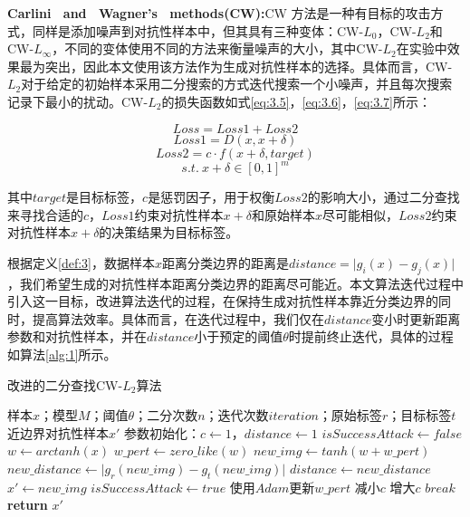 \noindent\textbf{Carlini \ and \ Wagner's \ methods(CW):}CW \cite{carlini2017towards}方法是一种有目标的攻击方式，同样是添加噪声到对抗性样本中，但其具有三种变体：CW-$L_0$，CW-$L_2$和CW-$L_{\infty}$，不同的变体使用不同的方法来衡量噪声的大小，其中CW-$L_2$在实验中效果最为突出，因此本文使用该方法作为生成对抗性样本的选择。具体而言，CW-$L_2$对于给定的初始样本采用二分搜索的方式迭代搜索一个小噪声，并且每次搜索记录下最小的扰动。CW-$L_2$的损失函数如式\ref{eq:3.5}，\ref{eq:3.6}，\ref{eq:3.7}所示：

\begin{equation}
	\label{eq:3.5}
	Loss = Loss1 + Loss2 
\end{equation}
\begin{equation}
	\label{eq:3.6}
	Loss1 = D(x, x + \delta)
\end{equation}
\begin{equation}
	\label{eq:3.7}
	Loss2 = c \cdot f(x + \delta,target)
\end{equation}
$$s.t. \ x + \delta \in [0,1]^m$$

\noindent 其中$target$是目标标签，$c$是惩罚因子，用于权衡$Loss2$的影响大小，通过二分查找来寻找合适的$c$，$Loss1$约束对抗性样本$x + \delta$和原始样本$x$尽可能相似，$Loss2$约束对抗性样本$x + \delta$的决策结果为目标标签。

根据定义\ref{def:3}，数据样本$x$距离分类边界的距离是$distance = \vert g_i(x) - g_j(x) \vert$，我们希望生成的对抗性样本距离分类边界的距离尽可能近。本文算法迭代过程中引入这一目标，改进算法迭代的过程，在保持生成对抗性样本靠近分类边界的同时，提高算法效率。具体而言，在迭代过程中，我们仅在$distance$变小时更新距离参数和对抗性样本，并在$distance$小于预定的阈值$\theta$时提前终止迭代，具体的过程如算法\ref{alg:1}所示。

\begin{algorithm}[H] 
	\caption{改进的二分查找CW-$L_2$算法}
	\label{alg:1}
	\begin{algorithmic}[1]
		
		\Require 样本$x$；模型$M$；阈值$\theta$；二分次数$n$；迭代次数$iteration$；原始标签$r$；目标标签$t$
		\Ensure 近边界对抗性样本$x'$
		\State 参数初始化：$c\gets1$，$distance \gets 1$
			\State $isSuccessAttack \gets false$
			\State $w \gets arctanh(x)$
			\State $w\_pert \gets zero\_like(w)$
				\State $new\_img \gets tanh(w + w\_pert)$
				\State $new\_distance \gets \vert g_r(new\_img) - g_t(new\_img) \vert$
					\State $distance \gets new\_distance$
					\State $x' \gets new\_img$
					\State $isSuccessAttack \gets true$
				\EndIf
				\State 使用$Adam$更新$w\_pert$
			\EndFor
			\State 减小$c$
			\Else \State 增大$c$
			\EndIf 
			\State $break$
			\EndIf
		\EndFor
		\State \textbf{return} $x'$
	\end{algorithmic}
\end{algorithm}


